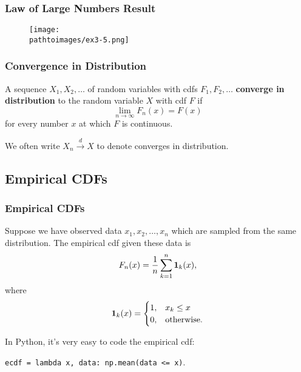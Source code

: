 \documentclass{beamer}
\newcommand{\pathtoimages}{/Users/charlesrambo/Desktop/Bootcamp24/Images}
\begin{document}
\begin{frame}
\frametitle{Law of Large Numbers Result}
\begin{figure}
\centering
\texttt{[image: \\pathtoimages/ex3-5.png]}
\end{figure}
\end{frame}

\begin{frame}
\frametitle{Convergence in Distribution}
\begin{Definition}
A sequence $X_1, X_2,\ldots$ of random variables with cdfs $F_1, F_2,\ldots$ {\bf converge in distribution} to the random variable $X$ with cdf $F$ if
$$
\lim_{n\to\infty} F_n(x) = F(x)
$$
for every number $x$ at which $F$ is continuous. 
\end{Definition}
We often write $X_n \stackrel{d}{\longrightarrow} X$ to denote converges in distribution.
\end{frame}

\subsection{Empirical CDFs}

\begin{frame}
\frametitle{Empirical CDFs}
\small
\begin{Definition}
Suppose we have observed data $x_1, x_2, \ldots, x_n$ which are sampled from the same distribution. The empirical cdf given these data is
$$
F_n(x) = \frac{1}{n} \sum_{k = 1}^n {\bf 1}_k (x),
$$
where
$$
 {\bf 1}_k(x) = \begin{cases} 1,	&	x _k\leq x\\ 0,&	\text{otherwise.}\end{cases}
$$
\end{Definition}
In Python, it's very easy to code the empirical cdf:
\begin{center} 
\texttt{ecdf = lambda x, data: np.mean(data <= x)}.
\end{center}
\end{frame}
\end{document}
